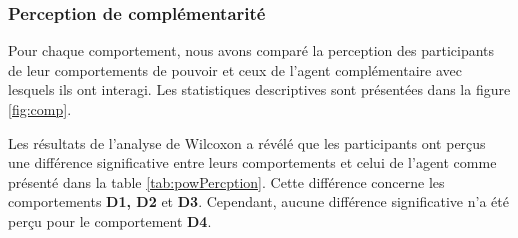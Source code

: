 	\subsubsection{Perception de complémentarité}
			
		Pour chaque comportement, nous avons comparé la perception des participants de leur comportements de pouvoir et ceux de l'agent complémentaire avec lesquels ils ont interagi. Les statistiques descriptives sont présentées dans la figure \ref{fig:comp}. 
		
		Les résultats de l'analyse de Wilcoxon a révélé que les participants ont perçus une différence significative entre leurs comportements et celui de l'agent comme présenté dans la table \ref{tab:powPercption}. Cette différence concerne les comportements \textbf{D1, D2} et \textbf{D3}. Cependant, aucune différence significative n'a été perçu pour le comportement \textbf{D4}. 
